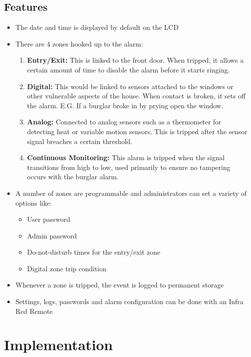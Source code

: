 \documentclass[a4paper,11pt]{article}
\theoremstyle{mytheor}
\begin{document}
\subsection{Features}
\begin{itemize}
    \item The date and time is displayed by default on the LCD 
    \item There are 4 zones hooked up to the alarm:
    \begin{enumerate}
        \item \textbf{Entry/Exit:} This is linked to the front door. When tripped, it allows a certain amount of time to disable the alarm before it starts ringing.
        \item \textbf{Digital:} This would be linked to sensors attached to the windows or other vulnerable aspects of the house. When contact is broken, it sets off the alarm. E.G. If a burglar broke in by prying open the window.
        \item \textbf{Analog:} Connected to analog sensors such as a thermometer for detecting heat or variable motion sensors. This is tripped after the sensor signal breaches a certain threshold.
        \item \textbf{Continuous Monitoring:} This alarm is tripped when the signal transitions from high to low, used primarily to ensure no tampering occurs with the burglar alarm.
    \end{enumerate}
    \item A number of zones are programmable and administrators can set a variety of options like:
    \begin{itemize}
        \item User password
        \item Admin password
        \item Do-not-disturb times for the entry/exit zone
        \item Digital zone trip condition
    \end{itemize}
    \item Whenever a zone is tripped, the event is logged to permanent storage
    \item Settings, logs, passwords and alarm configuration can be done with an Infra Red Remote
\end{itemize}

\newpage
\section{Implementation}
\end{document}
